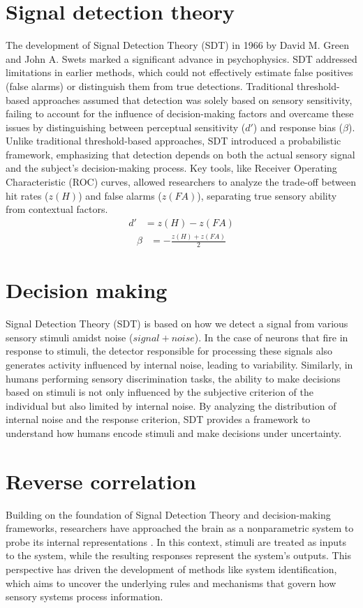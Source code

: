 \section {Signal detection theory} 
The development of Signal Detection Theory (SDT) in 1966 by David M. Green and John A. Swets \cite{d_m_green_and_j_a_swets_signal_1966} marked a significant advance in psychophysics. SDT addressed limitations in earlier methods, which could not effectively estimate false positives (false alarms) or distinguish them from true detections. Traditional threshold-based approaches assumed that detection was solely based on sensory sensitivity, failing to account for the influence of decision-making factors and overcame these issues by distinguishing between perceptual sensitivity ($d'$) and response bias ($\beta$). Unlike traditional threshold-based approaches, SDT introduced a probabilistic framework, emphasizing that detection depends on both the actual sensory signal and the subject's decision-making process. Key tools, like Receiver Operating Characteristic (ROC) curves, allowed researchers to analyze the trade-off between hit rates ($z(H)$) and false alarms ($z(FA)$), separating true sensory ability from contextual factors.  
\begin{align}
d'& = z(H)- z(FA)
\end{align}
\begin{align}
\beta& = -\frac{z(H) + z(FA)}{2}
\end{align}
\section {Decision making} 
Signal Detection Theory (SDT) is based on how we detect a signal from various sensory stimuli amidst noise ($signal+noise$). In the case of neurons that fire in response to stimuli, the detector responsible for processing these signals also generates activity influenced by internal noise, leading to variability. Similarly, in humans performing sensory discrimination tasks, the ability to make decisions based on stimuli is not only influenced by the subjective criterion of the individual but also limited by internal noise. By analyzing the distribution of internal noise and the response criterion, SDT provides a framework to understand how humans encode stimuli and make decisions under uncertainty.

\section {Reverse correlation} 
Building on the foundation of Signal Detection Theory and decision-making frameworks, researchers have approached the brain as a nonparametric system to probe its internal representations . In this context, stimuli are treated as inputs to the system, while the resulting responses represent the system's outputs. This perspective has driven the development of methods like system identification, which aims to uncover the underlying rules and mechanisms that govern how sensory systems process information.

